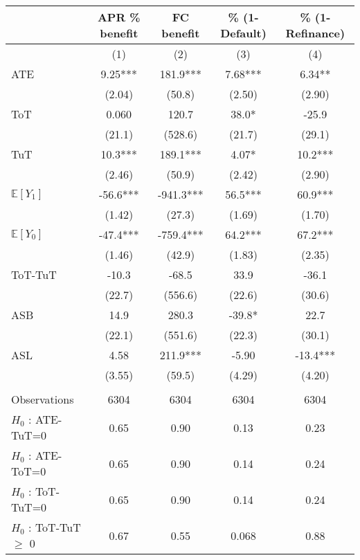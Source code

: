 \begin{tabular}{lcccc}
\toprule
      & APR \% benefit & FC benefit & \% (1-Default) & \% (1-Refinance) \\
\midrule
      & (1)   & (2)   & (3)   & (4) \\
\midrule
\midrule
ATE   & 9.25*** & 181.9*** & 7.68*** & 6.34** \\
      & (2.04) & (50.8) & (2.50) & (2.90) \\
ToT   & 0.060 & 120.7 & 38.0* & -25.9 \\
      & (21.1) & (528.6) & (21.7) & (29.1) \\
TuT   & 10.3*** & 189.1*** & 4.07* & 10.2*** \\
      & (2.46) & (50.9) & (2.42) & (2.90) \\
$\mathbb{E}[Y_1]$ & -56.6*** & -941.3*** & 56.5*** & 60.9*** \\
      & (1.42) & (27.3) & (1.69) & (1.70) \\
$\mathbb{E}[Y_0]$ & -47.4*** & -759.4*** & 64.2*** & 67.2*** \\
      & (1.46) & (42.9) & (1.83) & (2.35) \\
\midrule
ToT-TuT & -10.3 & -68.5 & 33.9  & -36.1 \\
      & (22.7) & (556.6) & (22.6) & (30.6) \\
ASB   & 14.9  & 280.3 & -39.8* & 22.7 \\
      & (22.1) & (551.6) & (22.3) & (30.1) \\
ASL   & 4.58  & 211.9*** & -5.90 & -13.4*** \\
      & (3.55) & (59.5) & (4.29) & (4.20) \\
      &       &       &       &  \\
\midrule
Observations & 6304  & 6304  & 6304  & 6304 \\
$H_0$ : ATE-TuT=0 & 0.65  & 0.90  & 0.13  & 0.23 \\
$H_0$ : ATE-ToT=0 & 0.65  & 0.90  & 0.14  & 0.24 \\
$H_0$ : ToT-TuT=0 & 0.65  & 0.90  & 0.14  & 0.24 \\
$H_0$ : ToT-TuT$\geq$ 0 & 0.67  & 0.55  & 0.068 & 0.88 \\
\bottomrule
\bottomrule
\end{tabular}%
